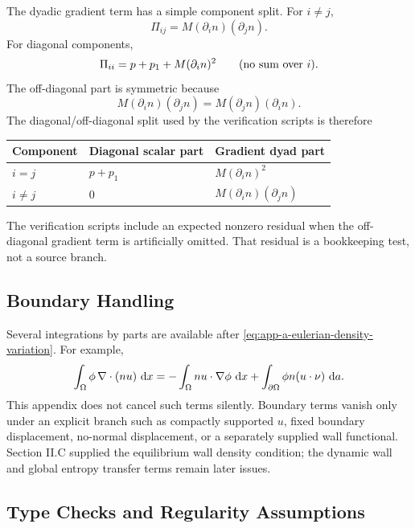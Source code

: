 The dyadic gradient term has a simple component split.  For \(i\ne j\),
\begin{equation}
  \Pi_{ij}
  =
  M(\partial_i n)(\partial_j n).
  \label{eq:app-a-off-diagonal}
\end{equation}
For diagonal components,
\begin{equation}
  \Pi_{ii}
  =
  p+p_1+M(\partial_i n)^2
  \qquad\hbox{(no sum over \(i\)).}
  \label{eq:app-a-diagonal}
\end{equation}
The off-diagonal part is symmetric because
\[
  M(\partial_i n)(\partial_j n)
  =
  M(\partial_j n)(\partial_i n).
\]
The diagonal/off-diagonal split used by the verification scripts is therefore
\begin{center}
\begin{tabular}{@{}lll@{}}
\toprule
Component & Diagonal scalar part & Gradient dyad part \\
\midrule
\(i=j\) & \(p+p_1\) & \(M(\partial_i n)^2\) \\
\(i\ne j\) & \(0\) & \(M(\partial_i n)(\partial_j n)\) \\
\bottomrule
\end{tabular}
\end{center}
The verification scripts include an expected nonzero residual when the
off-diagonal gradient term is artificially omitted.  That residual is a
bookkeeping test, not a source branch.

\subsection{Boundary Handling}

Several integrations by parts are available after
\eqref{eq:app-a-eulerian-density-variation}.  For example,
\[
  \int_\Omega \phi\,\nabla\cdot(nu)\,\,\mathrm{d} x
  =-
  \int_\Omega n u\cdot\nabla\phi\,\,\mathrm{d} x
  +
  \int_{\partial\Omega}\phi n(u\cdot\nu)\,\,\mathrm{d} a .
\]
This appendix does not cancel such terms silently.  Boundary terms vanish only
under an explicit branch such as compactly supported \(u\), fixed boundary
displacement, no-normal displacement, or a separately supplied wall functional.
Section II.C supplied the equilibrium wall density condition; the dynamic wall
and global entropy transfer terms remain later issues.

\subsection{Type Checks and Regularity Assumptions}

